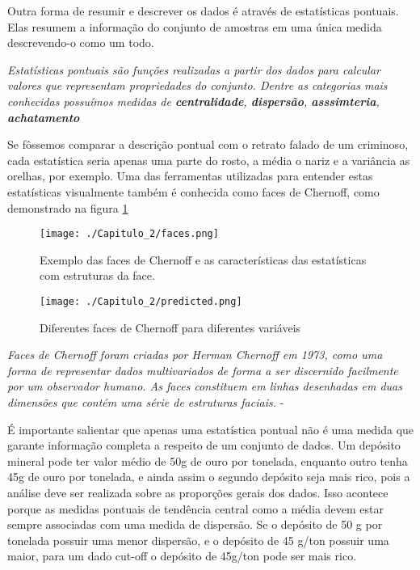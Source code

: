 Outra forma de resumir e descrever os dados é através de estatísticas pontuais. Elas resumem a informação do conjunto de amostras em uma única medida descrevendo-o como um todo.

\begin{definition}
\textit{Estatísticas pontuais são funções realizadas a partir dos dados para calcular valores que representam propriedades do conjunto. Dentre as categorias mais conhecidas possuímos medidas de \textbf{centralidade}, \textbf{dispersão}, \textbf{asssimteria}, \textbf{achatamento} }
\end{definition}

Se fôssemos comparar a descrição pontual com o retrato falado de um criminoso, cada estatística seria apenas uma parte do rosto, a média o nariz e a variância as orelhas, por exemplo. Uma das ferramentas utilizadas para entender estas estatísticas visualmente também é conhecida como faces de Chernoff, como demonstrado na figura \ref{Fig_chernoff}

\FloatBarrier
\begin{figure}[!htb]
\centering
\texttt{[image: ./Capitulo\_2/faces.png]}	
\caption{Exemplo das faces de Chernoff e as características das estatísticas com estruturas da face.}
\label{Fig_chernoff}
\end{figure}
\FloatBarrier

\FloatBarrier
\begin{figure}[!htb]
	\centering
	\texttt{[image: ./Capitulo\_2/predicted.png]}	
	\caption{Diferentes faces de Chernoff para diferentes variáveis}
	\label{Fig_chernoff_2}
\end{figure}
\FloatBarrier

\begin{proposition}
\textit{Faces de Chernoff foram criadas por Herman Chernoff em 1973, como uma forma de representar dados multivariados de forma a ser discernido facilmente por um observador humano. As faces constituem em linhas desenhadas em duas dimensões que contém uma série de estruturas faciais.} - \cite{morris2000experimental}
\end{proposition}


É importante salientar que apenas uma estatística pontual não é uma medida que garante informação completa a respeito de um conjunto de dados. Um depósito mineral pode ter valor médio de 50g de ouro por tonelada, enquanto outro tenha 45g de ouro por tonelada, e ainda assim o segundo depósito seja mais rico, pois a análise deve ser realizada sobre as proporções gerais dos dados. Isso acontece porque as medidas pontuais de tendência central como a média devem estar sempre associadas com uma medida de dispersão. Se o depósito de 50 g por tonelada possuir uma menor dispersão, e o depósito de 45 g/ton possuir uma maior, para um dado cut-off o depósito de 45g/ton pode ser mais rico.

